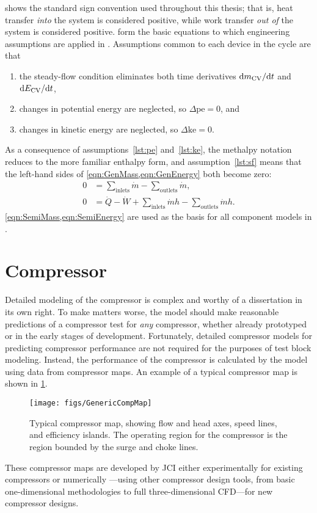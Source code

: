  shows the standard sign convention used throughout this thesis; 
that is, heat transfer \emph{into} the system is considered positive, 
while work transfer \emph{out of} the system is considered positive.
 form the basic equations to which 
engineering assumptions are applied in .
Assumptions common to each device in the cycle are that
\begin{enumerate}
  \item the steady-flow condition eliminates both time derivatives $\mathop{}\!\mathrm{d}{m_{\mathrm{CV}}}/\!\mathop{}\!\mathrm{d}{t}$ and $\mathop{}\!\mathrm{d}{E_{\mathrm{CV}}}/\!\mathop{}\!\mathrm{d}{t}$, \label{lst:sf}
  \item changes in potential energy are neglected, so $\Delta \text{pe} = 0$, and \label{lst:pe}
  \item changes in kinetic energy are neglected, so $\Delta \text{ke} = 0$. \label{lst:ke}
\end{enumerate}
As a consequence of assumptions~\ref{lst:pe} and~\ref{lst:ke},
the methalpy notation reduces to the more familiar enthalpy form,
and assumption~\ref{lst:sf} means that the left-hand sides of \cref{eqn:GenMass,eqn:GenEnergy} both become zero:
\begin{align}
  0 &= \sum_{\text{inlets}}{\dot{m}} - \sum_{\text{outlets}}{\dot{m}}, \label{eqn:SemiMass}\\
  0 &= \dot{Q} - \dot{W} + \sum_{\text{inlets}}{\dot{m}h} - \sum_{\text{outlets}}{\dot{m}h}. \label{eqn:SemiEnergy}
\end{align}
\cref{eqn:SemiMass,eqn:SemiEnergy} are used as the basis for all component models
in .

\section{Compressor} \label{sec:Compressor}
Detailed modeling of the compressor is complex and worthy of a dissertation in its own right. 
To make matters worse, the model should make reasonable predictions 
of a compressor test for \emph{any} compressor, 
whether already prototyped or in the early stages of development.
Fortunately, detailed compressor models 
for predicting compressor performance are not required for the purposes of test block modeling. 
Instead, the performance of the compressor is calculated by the model using
data from compressor maps. 
An example of a typical compressor map is shown in \cref{fig:GenMap}. 
\begin{figure}[htbp]
  \centering
  \texttt{[image: figs/GenericCompMap]}
  \caption{Typical compressor map, showing flow and head axes, speed lines, and efficiency islands.
    The operating region for the compressor is the region bounded by the surge and choke lines.}
  \label{fig:GenMap}
\end{figure}
These compressor maps are developed by JCI either 
experimentally for existing compressors or numerically%
---using other compressor design tools, from basic one-dimensional methodologies
to full three-dimensional CFD---for new compressor designs.


